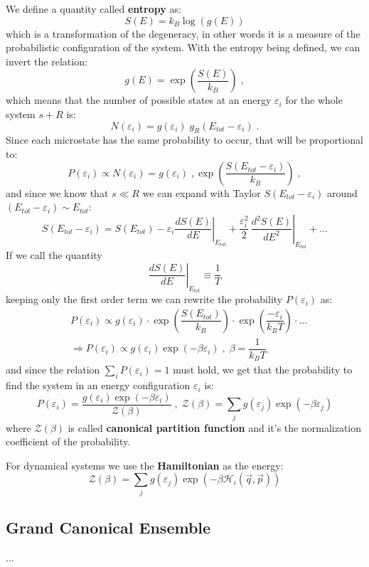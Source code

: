 \documentclass[12pt,a4paper]{article}
\begin{document}
We define a quantity called \textbf{entropy} as:
$$
S(E) = k_B \log(g(E))
$$
which is a transformation of the degeneracy, in other words it is a measure of the probabilistic configuration of the system. With the entropy being defined, we can invert the relation:
$$
g(E) = \exp(\dfrac{S(E)}{k_B})\;,
$$
which means that the number of possible states at an energy $\varepsilon_i$ for the whole system $s+R$ is:
$$
N(\varepsilon_i) = g(\varepsilon_i) \; g_R(E_{tot}-\varepsilon_i)\;.
$$
Since each microstate has the same probability to occur, that will be proportional to:
$$
P(\varepsilon_i) \propto N(\varepsilon_i) = g(\varepsilon_i) \;, \exp(\dfrac{S(E_{tot}-\varepsilon_i)}{k_B})\;,
$$
and since we know that $s\ll R$ we can expand with Taylor $S(E_{tot}-\varepsilon_i)$ around $(E_{tot}-\varepsilon_i) \sim E_{tot}$:
$$
S(E_{tot}-\varepsilon_i) = S(E_{tot}) - \varepsilon_i \left.\dfrac{dS(E)}{dE}\right|_{E_{tot}} + \left.\dfrac{\varepsilon_i^2}{2}\, \dfrac{d^2 S(E)}{dE^2}\right|_{E_{tot}} + \dots
$$
If we call the quantity
$$
\left.\dfrac{dS(E)}{dE}\right|_{E_{tot}} \equiv \dfrac{1}{T}
$$
keeping only the first order term we can rewrite the probability $P(\varepsilon_i)$ as:
\begin{align*}
&P(\varepsilon_i) \propto g(\varepsilon_i) \cdot \exp(\dfrac{S(E_{tot})}{k_B}) \cdot \exp(\dfrac{-\varepsilon_i}{k_B T}) \cdot \dots \\[7pt]
&\Rightarrow P(\varepsilon_i) \propto g(\varepsilon_i) \exp(-\beta \varepsilon_i)\;,\; \beta = \dfrac{1}{k_B T}
\end{align*}
and since the relation $\sum_{i} P(\varepsilon_i) = 1$ must hold, we get that the probability to find the system in an energy configuration $\varepsilon_i$ is:
$$
P(\varepsilon_i) = \dfrac{g(\varepsilon_i) \exp(-\beta \varepsilon_i)}{\mathcal{Z}(\beta)} \;,\; \mathcal{Z}(\beta) = \sum_{j} g(\varepsilon_j)\exp(-\beta \varepsilon_j)
$$
where $\mathcal{Z}(\beta)$ is called \textbf{canonical partition function} and it's the normalization coefficient of the probability.

For dynamical systems we use the \textbf{Hamiltonian} as the energy:
$$
\mathcal{Z}(\beta) = \sum_{j} g(\varepsilon_j)\exp(-\beta \mathcal{H}_i(\vec{q}, \vec{p}))
$$

\subsection{Grand Canonical Ensemble}
...
\end{document}
